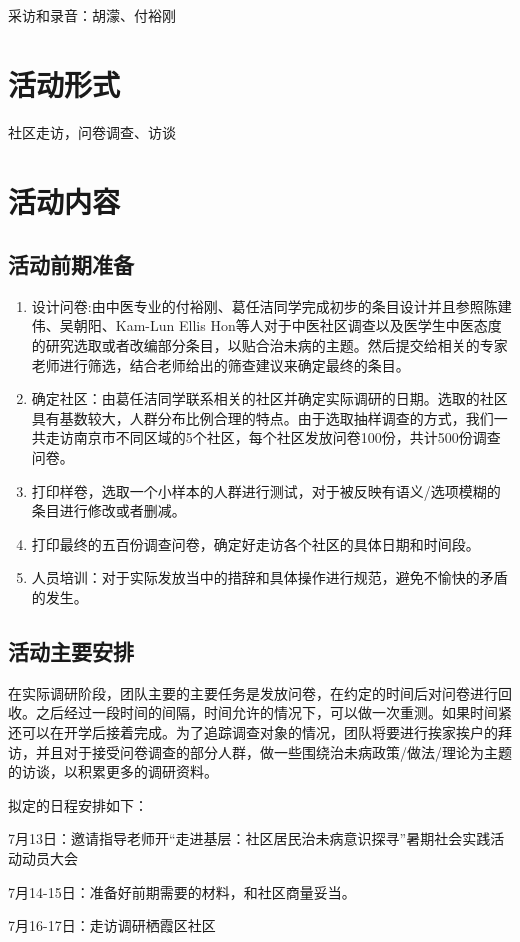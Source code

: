 \documentclass[12pt]{ctexart}
\begin{document}
    采访和录音：胡濛、付裕刚
    \section{活动形式}
    社区走访，问卷调查、访谈
    \section{活动内容}
    \subsection{活动前期准备}
    \begin{enumerate}
        \item 设计问卷:由中医专业的付裕刚、葛任洁同学完成初步的条目设计并且参照陈建伟、吴朝阳、Kam-Lun Ellis Hon等人对于中医社区调查以及医学生中医态度的研究选取或者改编部分条目，以贴合治未病的主题。然后提交给相关的专家老师进行筛选，结合老师给出的筛查建议来确定最终的条目。
        \item 确定社区：由葛任洁同学联系相关的社区并确定实际调研的日期。选取的社区具有基数较大，人群分布比例合理的特点。由于选取抽样调查的方式，我们一共走访南京市不同区域的5个社区，每个社区发放问卷100份，共计500份调查问卷。
        \item 打印样卷，选取一个小样本的人群进行测试，对于被反映有语义/选项模糊的条目进行修改或者删减。
        \item 打印最终的五百份调查问卷，确定好走访各个社区的具体日期和时间段。
        \item 人员培训：对于实际发放当中的措辞和具体操作进行规范，避免不愉快的矛盾的发生。   
    \end{enumerate}
   \subsection{活动主要安排}
   在实际调研阶段，团队主要的主要任务是发放问卷，在约定的时间后对问卷进行回收。之后经过一段时间的间隔，时间允许的情况下，可以做一次重测。如果时间紧还可以在开学后接着完成。为了追踪调查对象的情况，团队将要进行挨家挨户的拜访，并且对于接受问卷调查的部分人群，做一些围绕治未病政策/做法/理论为主题的访谈，以积累更多的调研资料。
   
   拟定的日程安排如下：
   
   7月13日：邀请指导老师开“走进基层：社区居民治未病意识探寻”暑期社会实践活动动员大会
   
  7月14-15日：准备好前期需要的材料，和社区商量妥当。
  
  7月16-17日：走访调研栖霞区社区
  
\end{document}
